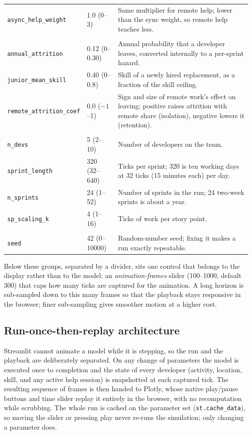 \documentclass[11pt,a4paper]{article}
\begin{document}
{\begin{longtable}{llp{8.2cm}}
\texttt{async\_help\_weight} & 1.0 (0--3) & Same multiplier for remote help; lower than the sync weight, so remote help teaches less. \\
\addlinespace
\multicolumn{3}{l}{\textit{Turnover}}\\
\texttt{annual\_attrition} & 0.12 (0--0.30) & Annual probability that a developer leaves, converted internally to a per-sprint hazard. \\
\texttt{junior\_mean\_skill} & 0.40 (0--0.8) & Skill of a newly hired replacement, as a fraction of the skill ceiling. \\
\texttt{remote\_attrition\_coef} & 0.0 ($-1$--1) & Sign and size of remote work's effect on leaving: positive raises attrition with remote share (isolation), negative lowers it (retention). \\
\addlinespace
\multicolumn{3}{l}{\textit{Structural}}\\
\texttt{n\_devs} & 5 (2--10) & Number of developers on the team. \\
\texttt{sprint\_length} & 320 (32--640) & Ticks per sprint; 320 is ten working days at 32 ticks (15 minutes each) per day. \\
\texttt{n\_sprints} & 24 (1--52) & Number of sprints in the run; 24 two-week sprints is about a year. \\
\texttt{sp\_scaling\_k} & 4 (1--16) & Ticks of work per story point. \\
\addlinespace
\multicolumn{3}{l}{\textit{Reproducibility}}\\
\texttt{seed} & 42 (0--10000) & Random-number seed; fixing it makes a run exactly repeatable. \\
\end{longtable}
}

Below these groups, separated by a divider, sits one control that belongs to the display rather than
to the model: an \emph{animation-frames} slider (100--1000, default 300) that caps how many ticks are
captured for the animation. A long horizon is sub-sampled down to this many frames so that the
playback stays responsive in the browser; finer sub-sampling gives smoother motion at a higher cost.

\subsection{Run-once-then-replay architecture}

Streamlit cannot animate a model while it is stepping, so the run and the playback are deliberately
separated. On any change of parameters the model is executed once to completion and the state of every
developer (activity, location, skill, and any active help session) is snapshotted at each captured
tick. The resulting sequence of frames is then handed to Plotly, whose native play/pause buttons and
time slider replay it entirely in the browser, with no recomputation while scrubbing. The whole run is
cached on the parameter set (\texttt{st.cache\_data}), so moving the slider or pressing play never
re-runs the simulation; only changing a parameter does.
\end{document}
